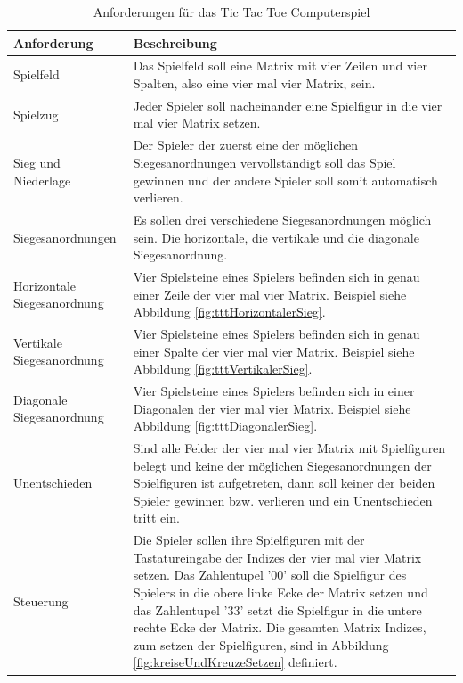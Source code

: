 \begin{table}
\caption{Anforderungen für das Tic Tac Toe Computerspiel}
\begin{tabularx}{\textwidth}{p{}|p{}}
\textbf{Anforderung} & \textbf{Beschreibung} \\
\hline
Spielfeld					& Das Spielfeld soll eine Matrix mit vier Zeilen und vier Spalten, also eine vier mal vier Matrix, sein. \\
\hline
Spielzug					& Jeder Spieler soll nacheinander eine Spielfigur in die vier mal vier Matrix setzen. \\
\hline
Sieg und Niederlage			& Der Spieler der zuerst eine der möglichen Siegesanordnungen vervollständigt soll das Spiel gewinnen und der andere Spieler soll somit automatisch verlieren. \\
\hline
Siegesanordnungen 			& Es sollen drei verschiedene Siegesanordnungen möglich sein. Die horizontale, die vertikale und die diagonale Siegesanordnung. \\
\hline
Horizontale Siegesanordnung	& Vier Spielsteine eines Spielers befinden sich in genau einer Zeile der vier mal vier Matrix. Beispiel siehe Abbildung \ref{fig:tttHorizontalerSieg}. \\
\hline
Vertikale Siegesanordnung	& Vier Spielsteine eines Spielers befinden sich in genau einer Spalte der vier mal vier Matrix. Beispiel siehe Abbildung \ref{fig:tttVertikalerSieg}. \\
\hline
Diagonale Siegesanordnung	& Vier Spielsteine eines Spielers befinden sich in einer Diagonalen der vier mal vier Matrix. Beispiel siehe Abbildung \ref{fig:tttDiagonalerSieg}. \\
\hline
Unentschieden				& Sind alle Felder der vier mal vier Matrix mit Spielfiguren belegt und keine der möglichen Siegesanordnungen der Spielfiguren ist aufgetreten, dann soll keiner der beiden Spieler gewinnen bzw. verlieren und ein Unentschieden tritt ein. \\
\hline
Steuerung 					& Die Spieler sollen ihre Spielfiguren mit der Tastatureingabe der Indizes der vier mal vier Matrix setzen. Das Zahlentupel '00' soll die Spielfigur des Spielers in die obere linke Ecke der Matrix setzen und das Zahlentupel '33' setzt die Spielfigur in die untere rechte Ecke der Matrix. Die gesamten Matrix Indizes, zum setzen der Spielfiguren, sind in Abbildung \ref{fig:kreiseUndKreuzeSetzen} definiert. \\
\end{tabularx}
\label{tab:tttAnforderungen}
\end{table}


